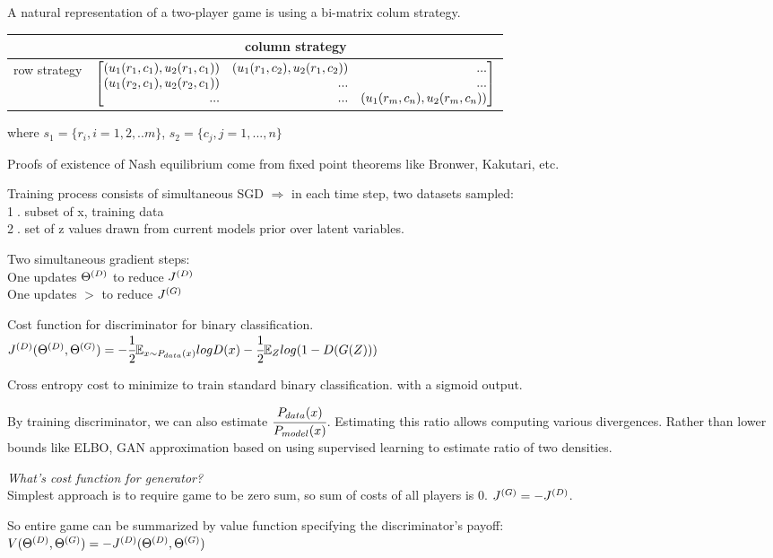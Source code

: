 \documentclass[12pt,a4paper]{article}
\begin{document}
A natural representation of a two-player game is using a bi-matrix colum strategy.

\begin{center}
\begin{tabular}{c | c}
    & column strategy \\
    \hline 
    row strategy & $\vecb{(u_1(r_1,c_1), u_2(r_1,c_1))&(u_1(r_1,c_2), u_2(r_1,c_2))&...\\
    (u_1(r_2,c_1), u_2(r_2,c_1)) & ... & ...\\
    ... & ... & (u_1(r_m,c_n), u_2(r_m,c_n))
    }$\\
\end{tabular}
\end{center}

where $s_1=\{r_i, i=1,2,..m\}$, $s_2=\{c_j, j=1,...,n\}$

Proofs of existence of Nash equilibrium come from fixed point theorems like Bronwer, Kakutari, etc. 

Training process consists of simultaneous SGD $\Rightarrow$ in each time step, two datasets sampled: \\
\textcircled{1}. subset of x, training data\\
\textcircled{2}. set of z values drawn from current models prior over latent variables.

Two simultaneous gradient steps:\\
One updates ${\Theta^{(D)}}$ to reduce $J^{(D)}$\\
One updates $\gt$ to reduce $J^{(G)}$

Cost function for discriminator for binary classification. \\
$J^{(D)}({\Theta^{(D)}},{\Theta^{(G)}})=-\cfrac{1}{2} \mathbb{E}_{x\sim P_{data}(x)}logD(x)-\cfrac{1}{2}\mathbb{E}_Zlog(1-D(G(Z)))$

Cross entropy cost to minimize to train standard binary classification. with a sigmoid output. 

By training discriminator, we can also estimate $\cfrac{P_{data}(x)}{P_{model}(x)}$. Estimating this ratio allows computing various divergences. 
Rather than lower bounds like ELBO, GAN approximation based on using supervised learning to estimate ratio of two densities. 

\vspace{0.5cm}
\textit{What's cost function for generator?}\\
Simplest approach is to require game to be zero sum, so sum of costs of all players is 0. $J^{(G)}=-J^{(D)}$. 

So entire game can be summarized by value function specifying the discriminator's payoff: \\
$V({\Theta^{(D)}},{\Theta^{(G)}})=-J^{(D)}({\Theta^{(D)}},{\Theta^{(G)}})$
\end{document}
